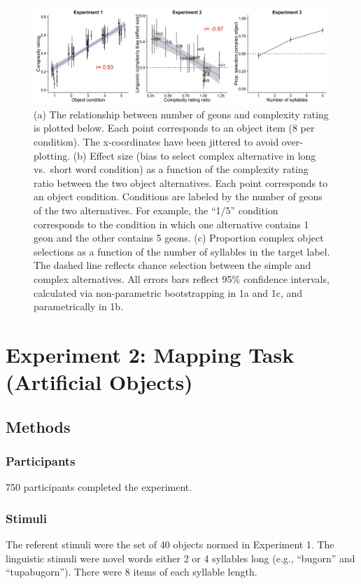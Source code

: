 \begin{figure}[t]
 \begin{center}
  \includegraphics[width=6in]{figs/study1_plots.png}
  \caption{ \label{fig:study1_plots} (a) The relationship between number of geons and complexity rating is plotted below. Each point corresponds to an object item (8 per condition). The x-coordinates have been jittered to avoid over-plotting. (b) Effect size (bias to select complex alternative in long vs.\ short word condition) as a function of the complexity rating ratio between the two object alternatives. Each point corresponds to an object condition. Conditions are labeled by the number of geons of the two alternatives. For example, the ``1/5'' condition corresponds to the condition in which one alternative contains 1 geon and the other contains 5 geons. (c) Proportion complex object selections as a function of the number of syllables in the target label. The dashed line reflects chance selection between the simple and complex alternatives. All errors bars reflect 95\% confidence intervals, calculated via non-parametric bootstrapping in 1a and 1c, and parametrically in 1b.
 }
 \end{center}
\end{figure}


\section{Experiment 2: Mapping Task (Artificial Objects)}


\subsection{Methods}
\subsubsection{Participants} 750 participants completed the experiment.
\subsubsection{Stimuli}
The referent stimuli were the set of 40 objects normed in Experiment 1. The linguistic stimuli were novel words either 2 or 4 syllables long (e.g., ``bugorn'' and ``tupabugorn''). There were 8 items of each syllable length.

